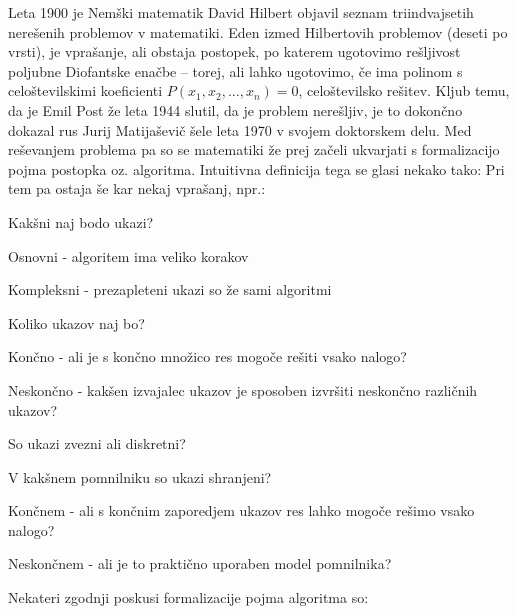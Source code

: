 \documentclass[10pt,a4paper,oneside]{book}
\begin{document}

Leta 1900 je Nemški matematik David Hilbert objavil seznam triindvajsetih nerešenih problemov v matematiki. Eden izmed Hilbertovih problemov (deseti po vrsti), je vprašanje, ali obstaja postopek, po katerem ugotovimo rešljivost poljubne Diofantske enačbe -- torej, ali lahko ugotovimo, če ima polinom s celoštevilskimi koeficienti $P(x_1, x_2, \dots, x_n)=0$, celoštevilsko rešitev.
Kljub temu, da je Emil Post že leta 1944 slutil, da je problem nerešljiv, je to dokončno dokazal rus Jurij Matijaševič šele leta 1970 v svojem doktorskem delu. Med reševanjem problema pa so se matematiki že prej začeli ukvarjati s formalizacijo pojma postopka oz. algoritma. Intuitivna definicija tega se glasi nekako tako:
Pri tem pa ostaja še kar nekaj vprašanj, npr.:
\begin{items}
\item Kakšni naj bodo ukazi? 
	\begin{items}
	\item Osnovni - algoritem ima veliko korakov
	\item Kompleksni - prezapleteni ukazi so že sami algoritmi
	\end{items}
\item Koliko ukazov naj bo?
	\begin{items}
	\item Končno - ali je s končno množico res mogoče rešiti vsako nalogo?
	\item Neskončno - kakšen izvajalec ukazov je sposoben izvršiti neskončno različnih ukazov?
	\end{items}
\item So ukazi zvezni ali diskretni?
\item V kakšnem pomnilniku so ukazi shranjeni?
	\begin{items}%
	\item Končnem - ali s končnim zaporedjem ukazov res lahko mogoče rešimo vsako nalogo?
	\item Neskončnem - ali je to praktično uporaben model pomnilnika?
	\end{items}
\end{items}
Nekateri zgodnji poskusi formalizacije pojma algoritma so:%
\end{document}
